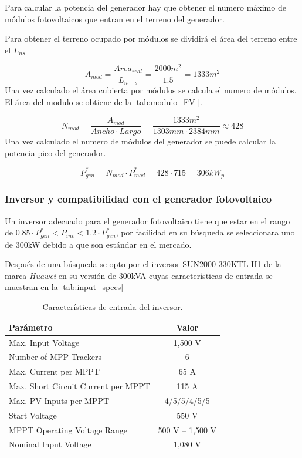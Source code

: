 \documentclass[12pt]{article}
\begin{document}
Para calcular la potencia del generador hay que obtener el numero máximo de módulos fotovoltaicos que entran en el terreno del generador.

Para obtener el terreno ocupado por módulos se dividirá el área del terreno entre el $L_{ns}$

\begin{equation}
	A_{mod}=\frac{Area_{real}}{L_{n-s}}=\frac{2000m^2}{1.5}=1333m^2
\end{equation}
Una vez calculado el área cubierta por módulos se calcula el numero de módulos.
El área del modulo se obtiene de la \autoref{tab:modulo_FV }.

\begin{equation}
	N_{mod}=\frac{A_{mod}}{Ancho\cdot Largo}=\frac{1333m^2}{1303mm\cdot 2384mm}\approx 428
\end{equation}
Una vez calculado el numero de módulos del generador se puede calcular la potencia pico del generador.

\begin{equation}
	P^*_{gen}=N_{mod}\cdot P^*_{mod}=428\cdot 715=306kW_p
\end{equation}
\subsubsection{Inversor y compatibilidad con el generador fotovoltaico}
Un inversor adecuado para el generador fotovoltaico tiene que estar en el rango de $0.85 \cdot P^*_{gen}<P_{inv}<1.2 \cdot P^*_{gen}$, por facilidad en su búsqueda se seleccionara uno de 300kW debido a que son estándar en el mercado.


Después de una búsqueda se opto por el inversor SUN2000-330KTL-H1 de la marca \textit{Huawei} en su versión de 300kVA cuyas características de entrada se muestran en la \autoref{tab:input_specs}

\begin{table}[h]
	\centering
	\caption{Características de entrada del inversor.}
	\label{tab:input_specs}
	\begin{tabular}{l c}
		\toprule
		\textbf{Parámetro} & \textbf{Valor} \\
		\midrule
		Max. Input Voltage & 1,500 V \\
		Number of MPP Trackers & 6 \\
		Max. Current per MPPT & 65 A \\
		Max. Short Circuit Current per MPPT & 115 A \\
		Max. PV Inputs per MPPT & 4/5/5/4/5/5 \\
		Start Voltage & 550 V \\
		MPPT Operating Voltage Range & 500 V -- 1,500 V \\
		Nominal Input Voltage & 1,080 V \\
		\bottomrule
	\end{tabular}
\end{table}
\end{document}
